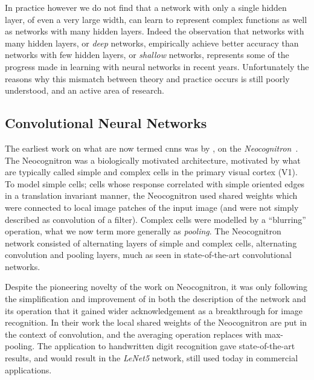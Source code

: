 \documentclass[thesis]{subfiles}
\begin{document}
In practice however we do not find that a network with only a single hidden layer, of even a very large width, can learn to represent complex functions as well as networks with many hidden layers. Indeed the observation that networks with many hidden layers, or \emph{deep} networks, empirically achieve better accuracy than networks with few hidden layers, or \emph{shallow} networks, represents some of the progress made in learning with neural networks in recent years. Unfortunately the reasons why this mismatch between theory and practice occurs is still poorly understood, and an active area of research.

\subsection{Convolutional Neural Networks}\label{cnns}
The earliest work on what are now termed \glspl{cnn} was by \citet{Fuk80}, on the \emph{Neocognitron}~\citep{fukushima2013artificial}. The Neocognitron was a biologically motivated architecture, motivated by what are typically called simple and complex cells in the primary visual cortex (V1). To model simple cells; cells whose response correlated with simple oriented edges in a translation invariant manner, the Neocognitron used shared weights which were connected to local image patches of the input image (and were not simply described as convolution of a filter). Complex cells were modelled by a ``blurring'' operation, what we now term more generally as \emph{pooling}. The Neocognitron network consisted of alternating layers of simple and complex cells, \ie alternating convolution and pooling layers, much as seen in state-of-the-art convolutional networks.

Despite the pioneering novelty of the work on Neocognitron, it was only following the simplification and improvement of \citet{Lecun1998} in both the description of the network and its operation that it gained wider acknowledgement as a breakthrough for image recognition. In their work the local shared weights of the Neocognitron are put in the context of convolution, and the averaging operation replaces with max-pooling. The application to handwritten digit recognition gave state-of-the-art results, and would result in the \emph{LeNet5} network, still used today in commercial applications.
\end{document}
